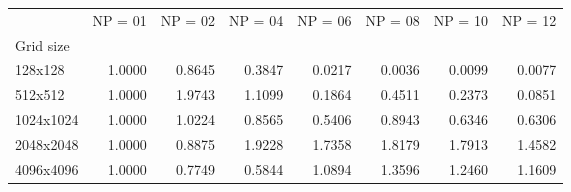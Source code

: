 \begin{tabular}{lrrrrrrr}
\toprule
{} &  NP = 01 &  NP = 02 &  NP = 04 &  NP = 06 &  NP = 08 &  NP = 10 &  NP = 12 \\
Grid size &          &          &          &          &          &          &          \\
\midrule
128x128   &   1.0000 &   0.8645 &   0.3847 &   0.0217 &   0.0036 &   0.0099 &   0.0077 \\
512x512   &   1.0000 &   1.9743 &   1.1099 &   0.1864 &   0.4511 &   0.2373 &   0.0851 \\
1024x1024 &   1.0000 &   1.0224 &   0.8565 &   0.5406 &   0.8943 &   0.6346 &   0.6306 \\
2048x2048 &   1.0000 &   0.8875 &   1.9228 &   1.7358 &   1.8179 &   1.7913 &   1.4582 \\
4096x4096 &   1.0000 &   0.7749 &   0.5844 &   1.0894 &   1.3596 &   1.2460 &   1.1609 \\
\bottomrule
\end{tabular}
